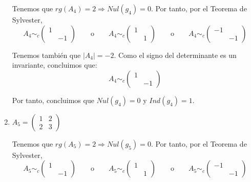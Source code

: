 \begin{ejercicio}
\begin{enumerate}
        Tenemos que $rg(A_4) = 2 \Longrightarrow Nul(g_4)=0$. Por tanto, por el Teorema de Sylvester,
        \begin{equation*}
            A_4 \sim_c \left(\begin{array}{cc}
                1 &  \\
                & -1
            \end{array} \right)
            \qquad \text{o} \qquad
            A_4 \sim_c \left(\begin{array}{cc}
                1 &  \\
                & 1
            \end{array} \right)
            \qquad \text{o} \qquad
            A_4 \sim_c \left(\begin{array}{cc}
                -1 &  \\
                & -1
            \end{array} \right)
        \end{equation*}

        Tenemos también que $|A_4| = -2$. Como el signo del determinante es un invariante, concluimos que:
        \begin{equation*}
            A_4 \sim_c \left(\begin{array}{cc}
                1 &  \\
                & -1
            \end{array} \right)
        \end{equation*}
        
        Por tanto, concluimos que $Nul(g_4)=0$ y $Ind(g_4)=1$.

        \item $A_5=\left(\begin{array}{cc}
            1 & 2 \\
            2 & 3
        \end{array} \right)$
        
        Tenemos que $rg(A_5) = 2 \Longrightarrow Nul(g_5)=0$. Por tanto, por el Teorema de Sylvester,
        \begin{equation*}
            A_5 \sim_c \left(\begin{array}{cc}
                1 &  \\
                & -1
            \end{array} \right)
            \qquad \text{o} \qquad
            A_5 \sim_c \left(\begin{array}{cc}
                1 &  \\
                & 1
            \end{array} \right)
            \qquad \text{o} \qquad
            A_5 \sim_c \left(\begin{array}{cc}
                -1 &  \\
                & -1
            \end{array} \right)
        \end{equation*}


\end{enumerate}
\end{ejercicio}

